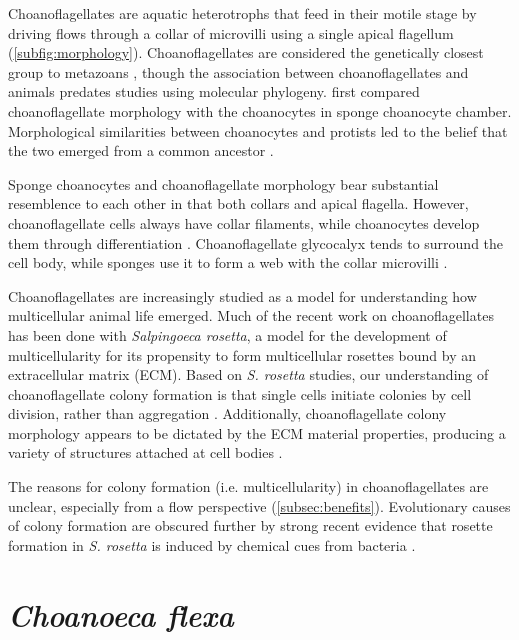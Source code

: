Choanoflagellates are aquatic heterotrophs that feed in their motile stage by driving flows through a collar of microvilli using a single apical flagellum \citep{karpov1998} (\cref{subfig:morphology}).
Choanoflagellates are considered the genetically closest group to metazoans \citep{carr2008}, though the association between choanoflagellates and animals predates studies using molecular phylogeny.
\citet{james1871} first compared choanoflagellate morphology with the choanocytes in sponge choanocyte chamber. 
Morphological similarities between choanocytes and protists led to the belief that the two emerged from a common ancestor \citep{saedeleer1930,tuzet1963}.

Sponge choanocytes and choanoflagellate morphology bear substantial resemblence to each other in that both collars and apical flagella.
However, choanoflagellate cells always have collar filaments, while choanocytes develop them through differentiation \citep{mah2014}.
Choanoflagellate glycocalyx tends to surround the cell body, while sponges use it to form a web with the collar microvilli \citep{leadbeater2008}.

Choanoflagellates are increasingly studied as a model for understanding how multicellular animal life emerged. 
Much of the recent work on choanoflagellates has been done with \textit{Salpingoeca rosetta}, a model for the development of multicellularity for its propensity to form multicellular rosettes bound by an extracellular matrix (ECM).
Based on \textit{S. rosetta} studies, our understanding of choanoflagellate colony formation is that single cells initiate colonies by cell division, rather than aggregation \citep{fairclough2010}.
Additionally, choanoflagellate colony morphology appears to be dictated by the ECM material properties, producing a variety of structures attached at cell bodies \citep{larson2020}.

The reasons for colony formation (i.e. multicellularity) in choanoflagellates are unclear, especially from a flow perspective (\cref{subsec:benefits}). 
Evolutionary causes of colony formation are obscured further by strong recent evidence that rosette formation in \textit{S. rosetta} is induced by chemical cues from bacteria \citep{alegado2012,woznica2016}.

\section{\textit{Choanoeca flexa}}  %

